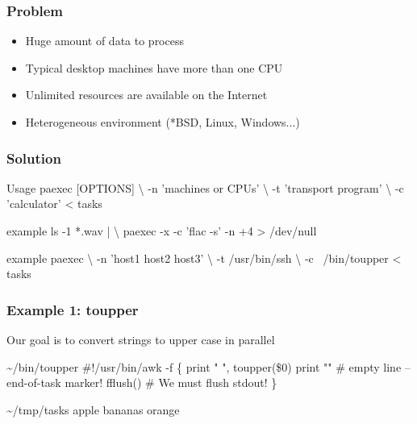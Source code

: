 \documentclass[hyperref={colorlinks=true}]{beamer}
\begin{document}

\begin{frame}
  \titlepage
\end{frame}

\begin{frame}{}
  \frametitle{Problem}
  \begin{block}{}
    \begin{itemize}
    \item Huge amount of data to process
    \item Typical desktop machines have more than one CPU
    \item Unlimited resources are available on the Internet
    \item Heterogeneous environment (*BSD, Linux, Windows...)
    \end{itemize}
  \end{block}
\end{frame}

\begin{frame}[fragile]
  \frametitle{Solution}

  \begin{block}{}
      \begin{CodeLarge}{Usage}
paexec [OPTIONS] \textbackslash
  -n 'machines or CPUs' \textbackslash
  -t 'transport program' \textbackslash
  -c 'calculator' < tasks
      \end{CodeLarge}
      \begin{CodeLarge}{example}
ls -1 *.wav | \textbackslash
paexec -x -c 'flac -s' -n +4 > /dev/null
      \end{CodeLarge}
      \begin{CodeLarge}{example}
paexec \textbackslash
  -n 'host1 host2 host3' \textbackslash
  -t /usr/bin/ssh \textbackslash
  -c ~/bin/toupper < tasks
      \end{CodeLarge}
  \end{block}
\end{frame}

\begin{frame}[fragile]
  \frametitle{Example 1: toupper}
  Our goal is to convert strings to upper case in parallel
  \begin{block}{}
      \begin{Code}{\~{}/bin/toupper}
#!/usr/bin/awk -f
\{
   print " ", toupper(\$0)
   print ""  # empty line -- end-of-task marker!
   fflush()  # We must flush stdout!
\}
      \end{Code}
  \end{block}
  \begin{block}{}
      \begin{Code}{\~{}/tmp/tasks}
apple
bananas
orange
      \end{Code}
  \end{block}
\end{frame}
\end{document}
